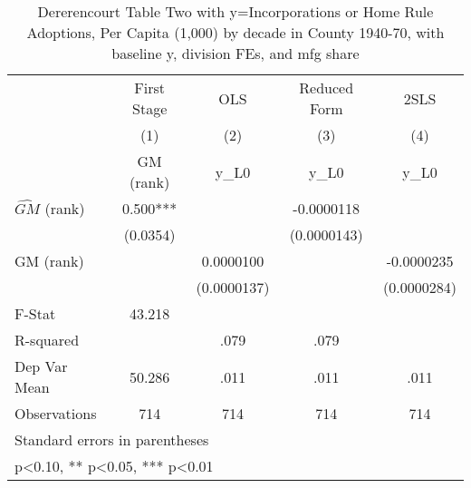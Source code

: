\begin{table}[htbp]\centering
\def\sym#1{\ifmmode^{#1}\else\(^{#1}\)\fi}
\caption{Dererencourt Table Two with y=Incorporations or Home Rule Adoptions, Per Capita (1,000) by decade in County 1940-70, with baseline y, division FEs, and mfg share}
\begin{tabular}{l*{4}{c}}
\toprule
                    & First Stage   &         OLS   &Reduced Form   &        2SLS   \\
                    &\multicolumn{1}{c}{(1)}&\multicolumn{1}{c}{(2)}&\multicolumn{1}{c}{(3)}&\multicolumn{1}{c}{(4)}\\
                    &\multicolumn{1}{c}{GM  (rank)}&\multicolumn{1}{c}{y\_L0}&\multicolumn{1}{c}{y\_L0}&\multicolumn{1}{c}{y\_L0}\\
\midrule
$\hat{GM}$ (rank)   &       0.500***&               &  -0.0000118   &               \\
                    &    (0.0354)   &               & (0.0000143)   &               \\
\addlinespace
GM  (rank)          &               &   0.0000100   &               &  -0.0000235   \\
                    &               & (0.0000137)   &               & (0.0000284)   \\
\midrule
F-Stat              &      43.218   &               &               &               \\
R-squared           &               &        .079   &        .079   &               \\
Dep Var Mean        &      50.286   &        .011   &        .011   &        .011   \\
Observations        &         714   &         714   &         714   &         714   \\
\bottomrule
\multicolumn{5}{l}{\footnotesize Standard errors in parentheses}\\
\multicolumn{5}{l}{\footnotesize * p<0.10, ** p<0.05, *** p<0.01}\\
\end{tabular}
\end{table}
